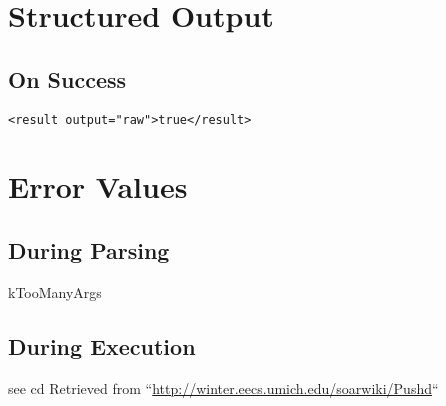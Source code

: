 \documentclass[10pt]{article}
\begin{document}
\section*{ Structured Output }
\subsection*{ On Success }
\begin{verbatim}
<result output="raw">true</result>

\end{verbatim}
\section*{ Error Values }
\subsection*{ During Parsing }


 kTooManyArgs
\subsection*{ During Execution }


 see cd Retrieved from ``\url{http://winter.eecs.umich.edu/soarwiki/Pushd}``
\end{document}
